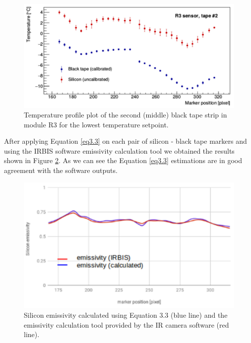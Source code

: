		\begin{figure}[ht!]
			\centering
			\captionsetup{justification=centering,margin=2cm}
			\includegraphics[scale=0.35]{Figures/Chapter04/R3Profile_Si_and_BT.jpg}
			\caption{Temperature profile plot of the second (middle) black tape strip in module R3 for the lowest temperature setpoint.}\label{fig4.5}
		\end{figure}
		
		After applying Equation \ref{eq3.3} on each pair of silicon - black tape markers and using the IRBIS software emissivity calculation tool we obtained the results shown in Figure \ref{fig4.6}. As we can see the Equation \ref{eq3.3} estimations are in good agreement with the software outputs. 
	
		\begin{figure}[ht!]
			\centering
			\captionsetup{justification=centering,margin=2cm}
			\includegraphics[scale=0.35]{Figures/Chapter04/SiliconEmissivityCalculatedVSIRBIS.jpg}
			\caption{Silicon emissivity calculated using Equation 3.3 (blue line) and the emissivity calculation tool provided by the IR camera software (red line).}\label{fig4.6}
		\end{figure}
		
